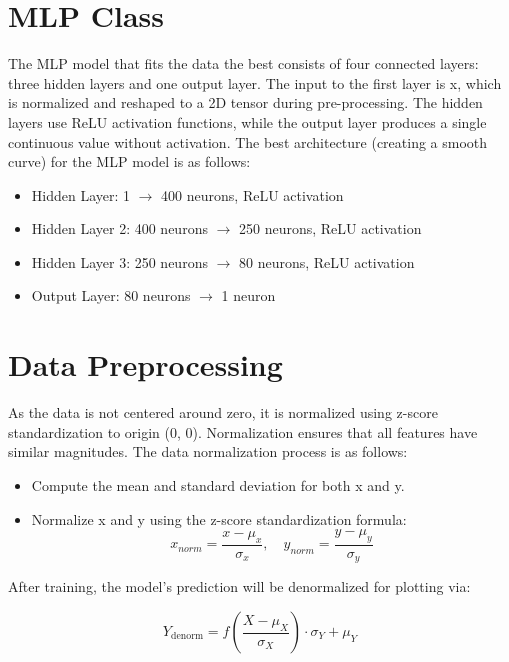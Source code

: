 \documentclass[12pt]{article}
\begin{document}
\newpage

\section{MLP Class}
The MLP model that fits the data the best consists of four connected layers: three hidden layers and one output layer.
The input to the first layer is x, which is normalized and reshaped to a 2D tensor during pre-processing.
The hidden layers use ReLU activation functions, while the output layer produces a single continuous value without activation.
The best architecture (creating a smooth curve) for the MLP model is as follows:

\begin{itemize}
    \item Hidden Layer: 1 $\rightarrow$ 400 neurons, ReLU activation
    \item Hidden Layer 2: 400 neurons $\rightarrow$ 250 neurons, ReLU activation
    \item Hidden Layer 3: 250 neurons $\rightarrow$ 80 neurons, ReLU activation
    \item Output Layer: 80 neurons $\rightarrow$ 1 neuron
\end{itemize}

\section{Data Preprocessing}
As the data is not centered around zero, it is normalized using z-score standardization to origin (0, 0).
Normalization ensures that all features have similar magnitudes.
The data normalization process is as follows:

\begin{itemize}
    \item Compute the mean and standard deviation for both x and y.
    \item Normalize x and y using the z-score standardization formula:
        \begin{equation*}
            x_{norm} = \frac{x - \mu_x}{\sigma_x},\quad y_{norm} = \frac{y - \mu_y}{\sigma_y}
        \end{equation*}
\end{itemize}

After training, the model's prediction will be denormalized for plotting via:

\begin{equation*}
    Y_{\text{denorm}} = f\left(\frac{X - \mu_X}{\sigma_X}\right) \cdot \sigma_Y + \mu_Y
\end{equation*}
\end{document}
